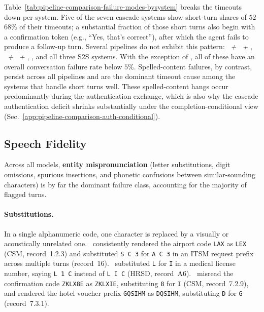 Table~\ref{tab:pipeline-comparison-failure-modes-bysystem} breaks the timeouts down per system. Five of the seven cascade systems show short-turn shares of $52$--$68\%$ of their timeouts; a substantial fraction of those short turns also begin with a confirmation token (e.g., ``Yes, that's correct''), after which the agent fails to produce a follow-up turn. Several pipelines do not exhibit this pattern: \emph{\scribefull~+ \geminiflashfull~+ \conversationalfull}, \emph{\parakeetfull~+ \gemmaBfull~+ \kokorofull}, \emph{\ultravoxfull}, and all three S2S systems. With the exception of \emph{\ultravoxfull}, all of these have an overall conversation failure rate below $5\%$. Spelled-content failures, by contrast, persist across all pipelines and are the dominant timeout cause among the systems that handle short turns well. These spelled-content hangs occur predominantly during the authentication exchange, which is also why the cascade authentication deficit shrinks substantially under the completion-conditional view (Sec.~\ref{app:pipeline-comparison-auth-conditional}).




\subsection{Speech Fidelity}
\label{app:speech-fidelity}

Across all models, \textbf{entity mispronunciation} (letter substitutions, digit omissions, spurious insertions, and phonetic confusions between similar-sounding characters) is by far the dominant failure class, accounting for the majority of flagged turns.

\paragraph{Substitutions.}
In a single alphanumeric code, one character is replaced by a visually or acoustically unrelated one.
\emph{\sonicfull}~consistently rendered the airport code \texttt{LAX} as \texttt{LEX} (CSM, record~1.2.3) and substituted \texttt{S~C~3} for \texttt{A~C~3} in an ITSM request prefix across multiple turns (record~16).
\emph{\aurafull}~substituted \texttt{L} for \texttt{I} in a medical license number, saying \texttt{L~1~C} instead of \texttt{L~I~C} (HRSD, record~A6).
\emph{\ultravoxfull}~misread the confirmation code \texttt{ZKLX8E} as \texttt{ZKLXIE}, substituting \texttt{8} for \texttt{I} (CSM, record~7.2.9), and rendered the hotel voucher prefix \texttt{GQSIHM} as \texttt{DQSIHM}, substituting \texttt{D} for \texttt{G} (record~7.3.1).

